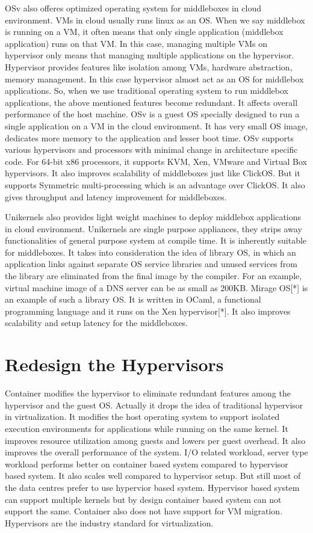 \documentclass[a4paper,11pt]{report}
\begin{document}
OSv\cite{R2} also offeres optimized operating system for middleboxes in cloud environment. VMs in cloud usually runs linux as an OS. When we say middlebox is running on a VM, it often means that only single application (middlebox application) runs on that VM. In this case, managing multiple VMs on hypervisor only means that managing multiple applications on the hypervisor. Hypervisor provides features like isolation among VMs, hardware abstraction, memory management. In this case hypervisor almost act as an OS for middlebox applications. So, when we use traditional operating system to run middlebox applications, the above mentioned features become redundant. It affects overall performance of the host machine. OSv is a guest OS specially designed to run a single application on a VM in the cloud environment. It has very small OS image, dedicates more memory to the application and lesser boot time. OSv supports various hypervisors and processors with minimal change in architecture specific code. For 64-bit x86 processors, it supports KVM, Xen, VMware and Virtual Box hypervisors. It also improves scalability of middleboxes just like ClickOS. But it supports Symmetric multi-processing which is an advantage over ClickOS. It also gives throughput and latency improvement for middleboxes.

Unikernels\cite{R3} also provides light weight machines to deploy middlebox applications in cloud environment. Unikernels are single purpose appliances, they strips away functionalities of general purpose system at compile time. It is inherently suitable for middleboxes. It takes into consideration the idea of library OS, in which an application links against separate OS service libraries and unused services from the library are eliminated from the final image by the compiler. For an example, virtual machine image of a DNS server can be as small as 200KB. Mirage OS[*] is an example of such a library OS. It is written in OCaml, a functional programming language and it runs on the Xen hypervisor[*]. It also improves scalability and setup latency for the middleboxes.                    
\section{Redesign the Hypervisors}
Container\cite{R4} modifies the hypervisor to eliminate redundant features among the hypervisor and the guest OS. Actually it drops the idea of traditional hypervisor in virtualization. It modifies the host operating system to support isolated execution environments for applications while running on the same kernel. It improves resource utilization among guests and lowers per guest overhead. It also improves the overall performance of the system. I/O related workload, server type workload performs better on container based system compared to hypervisor based system. It also scales well compared to hypervisor setup. But still most of the data centres prefer to use hypervior based system. Hypervisor based system can support multiple kernels but by design container based system can not support the same. Container also does not have support for VM migration. Hypervisors are the industry standard for virtualization.       
\end{document}

